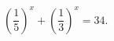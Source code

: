 \begin{ex}[type=equation]
	\begin{condition}
		$\left(\dfrac{1}{5}\right)^x + \left(\dfrac{1}{3}\right)^x = 34.$
	\end{condition}
\end{ex}